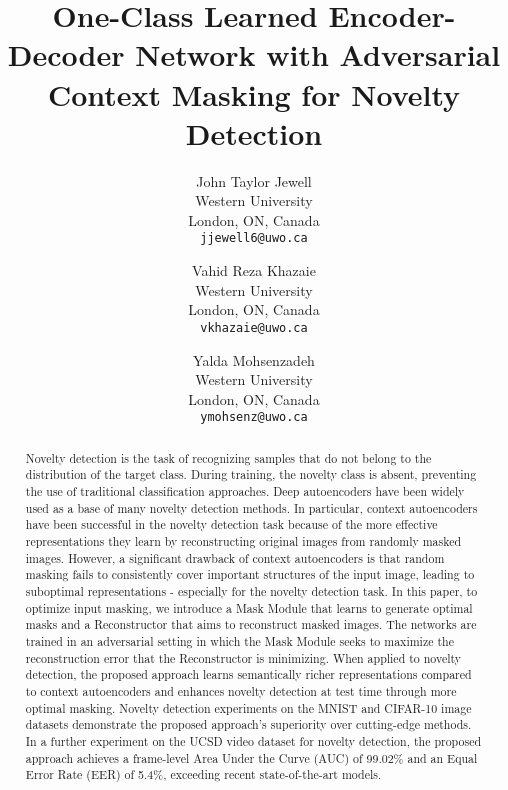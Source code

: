 \documentclass[10pt,twocolumn,letterpaper]{article}
\begin{document}
\title{One-Class Learned Encoder-Decoder Network with Adversarial Context Masking for Novelty Detection}

\author{John Taylor Jewell\\
Western University\\
London, ON, Canada\\
{\tt\small jjewell6@uwo.ca}
\and
Vahid Reza Khazaie\\
Western University\\
London, ON, Canada\\
{\tt\small vkhazaie@uwo.ca}

\and
Yalda Mohsenzadeh\\
Western University\\
London, ON, Canada\\
{\tt\small ymohsenz@uwo.ca}

}


\maketitle


\begin{abstract}
Novelty detection is the task of recognizing samples that do not belong to the distribution of the target class. During training, the novelty class is absent, preventing the use of traditional classification approaches. Deep autoencoders have been widely used as a base of many novelty detection methods. In particular, context autoencoders have been successful in the novelty detection task because of the more effective representations they learn by reconstructing original images from randomly masked images. However, a significant drawback of context autoencoders is that random masking fails to consistently cover important structures of the input image, leading to suboptimal representations - especially for the novelty detection task. In this paper, to optimize input masking, we introduce a Mask Module that learns to generate optimal masks and a Reconstructor that aims to reconstruct masked images. The networks are trained in an adversarial setting in which the Mask Module seeks to maximize the reconstruction error that the Reconstructor is minimizing. When applied to novelty detection, the proposed approach learns semantically richer representations compared to context autoencoders and enhances novelty detection at test time through more optimal masking. Novelty detection experiments on the MNIST and CIFAR-10 image datasets demonstrate the proposed approach's superiority over cutting-edge methods. In a further experiment on the UCSD video dataset for novelty detection, the proposed approach achieves a frame-level Area Under the Curve (AUC) of 99.02\% and an Equal Error Rate (EER) of 5.4\%, exceeding recent state-of-the-art models.
\end{abstract}
\end{document}
